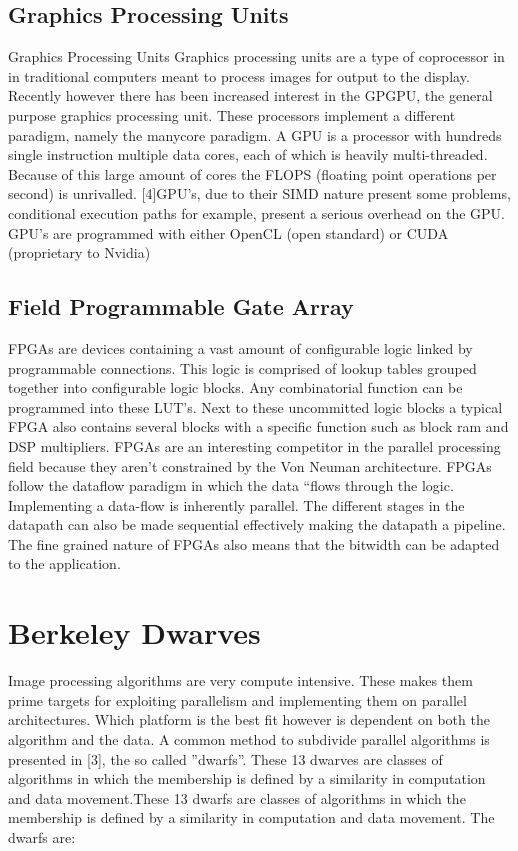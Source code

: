 \subsection{Graphics Processing Units} Graphics Processing Units
Graphics processing units are a type of coprocessor in in traditional computers meant to process images for output to the display. Recently however there has been increased interest in the GPGPU, the general purpose graphics processing unit. These processors implement a different paradigm, namely the manycore paradigm. A  GPU is a processor with hundreds single instruction multiple data cores, each of which is heavily multi-threaded. Because of this large amount of cores the FLOPS (floating point operations per second) is unrivalled. [4]GPU's, due to their SIMD nature present some problems, conditional execution paths for example, present a serious overhead on the GPU. GPU's are programmed with either OpenCL (open standard) or CUDA (proprietary to Nvidia)

\subsection{Field Programmable Gate Array} 
FPGAs are devices containing a vast amount of configurable logic linked by programmable connections. This logic is comprised of lookup tables grouped together into configurable logic blocks. Any combinatorial function can be programmed into these LUT's. Next to these uncommitted logic blocks a typical FPGA also contains several blocks with a specific function such as block ram and DSP multipliers. FPGAs are an interesting competitor in the parallel processing field because they aren't constrained by the Von Neuman architecture. FPGAs follow the dataflow paradigm in which the data “flows through the logic. Implementing a data-flow is inherently parallel. The different stages in the datapath can also be made sequential effectively making the datapath a pipeline. The fine grained nature of FPGAs also means that the bitwidth can be adapted to the application.


\section{Berkeley Dwarves}

Image processing algorithms are very compute intensive. These makes them prime targets for exploiting parallelism and implementing them on parallel architectures. Which platform is the best fit however is dependent on both the algorithm and the data. A common method to subdivide parallel algorithms is presented in [3], the so called ''dwarfs''. These 13 dwarves are classes of algorithms in which the membership is defined by a similarity in computation and data movement.These 13 dwarfs are classes of algorithms in which the membership is defined by a similarity in computation and data movement.
The dwarfs are:

